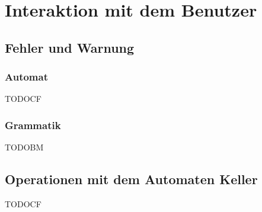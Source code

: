 

\chapter{Interaktion mit dem Benutzer}\label{Interaction}


\section{Fehler und Warnung}


\subsection{Automat}

TODOCF


\subsection{Grammatik}

TODOBM


\section{Operationen mit dem Automaten Keller}

TODOCF